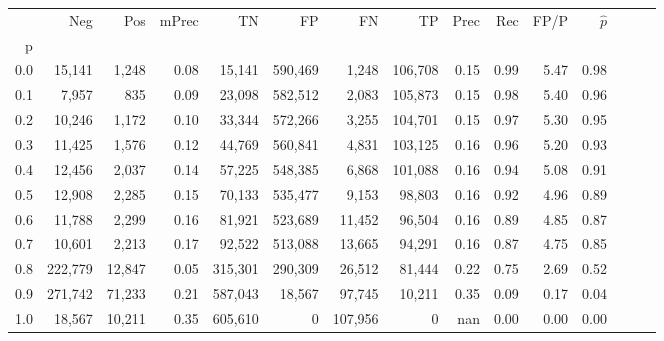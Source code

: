 \begin{tabular}{rrrrrrrrrrrrrrr}
\toprule
{} &      Neg &     Pos & mPrec &       TN &       FP &       FN &       TP &  Prec &   Rec &  FP/P & $\hat{p}$ \\
p   &          &         &       &          &          &          &          &       &       &       &           \\
\midrule
0.0 &   15,141 &   1,248 &  0.08 &   15,141 &  590,469 &    1,248 &  106,708 &  0.15 &  0.99 &  5.47 &      0.98 \\
0.1 &    7,957 &     835 &  0.09 &   23,098 &  582,512 &    2,083 &  105,873 &  0.15 &  0.98 &  5.40 &      0.96 \\
0.2 &   10,246 &   1,172 &  0.10 &   33,344 &  572,266 &    3,255 &  104,701 &  0.15 &  0.97 &  5.30 &      0.95 \\
0.3 &   11,425 &   1,576 &  0.12 &   44,769 &  560,841 &    4,831 &  103,125 &  0.16 &  0.96 &  5.20 &      0.93 \\
0.4 &   12,456 &   2,037 &  0.14 &   57,225 &  548,385 &    6,868 &  101,088 &  0.16 &  0.94 &  5.08 &      0.91 \\
0.5 &   12,908 &   2,285 &  0.15 &   70,133 &  535,477 &    9,153 &   98,803 &  0.16 &  0.92 &  4.96 &      0.89 \\
0.6 &   11,788 &   2,299 &  0.16 &   81,921 &  523,689 &   11,452 &   96,504 &  0.16 &  0.89 &  4.85 &      0.87 \\
0.7 &   10,601 &   2,213 &  0.17 &   92,522 &  513,088 &   13,665 &   94,291 &  0.16 &  0.87 &  4.75 &      0.85 \\
0.8 &  222,779 &  12,847 &  0.05 &  315,301 &  290,309 &   26,512 &   81,444 &  0.22 &  0.75 &  2.69 &      0.52 \\
0.9 &  271,742 &  71,233 &  0.21 &  587,043 &   18,567 &   97,745 &   10,211 &  0.35 &  0.09 &  0.17 &      0.04 \\
1.0 &   18,567 &  10,211 &  0.35 &  605,610 &        0 &  107,956 &        0 &   nan &  0.00 &  0.00 &      0.00 \\
\bottomrule
\end{tabular}
